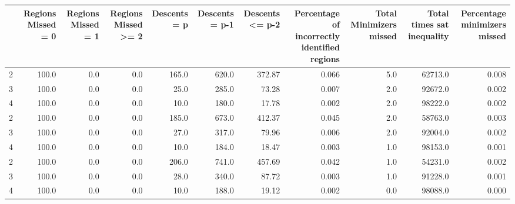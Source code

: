 \begin{tabular}{lrrrrrrrrrr}
\toprule
{} &  Regions Missed = 0 &  Regions Missed = 1 &  Regions Missed >= 2 &  Descents = p &  Descents = p-1 &  Descents <= p-2 &  Percentage of incorrectly identified regions &  Total Minimizers missed &  Total times sat inequality &  Percentage minimizers missed \\
\midrule
2 &               100.0 &                 0.0 &                  0.0 &         165.0 &           620.0 &           372.87 &                                         0.066 &                      5.0 &                     62713.0 &                         0.008 \\
3 &               100.0 &                 0.0 &                  0.0 &          25.0 &           285.0 &            73.28 &                                         0.007 &                      2.0 &                     92672.0 &                         0.002 \\
4 &               100.0 &                 0.0 &                  0.0 &          10.0 &           180.0 &            17.78 &                                         0.002 &                      2.0 &                     98222.0 &                         0.002 \\
2 &               100.0 &                 0.0 &                  0.0 &         185.0 &           673.0 &           412.37 &                                         0.045 &                      2.0 &                     58763.0 &                         0.003 \\
3 &               100.0 &                 0.0 &                  0.0 &          27.0 &           317.0 &            79.96 &                                         0.006 &                      2.0 &                     92004.0 &                         0.002 \\
4 &               100.0 &                 0.0 &                  0.0 &          10.0 &           184.0 &            18.47 &                                         0.003 &                      1.0 &                     98153.0 &                         0.001 \\
2 &               100.0 &                 0.0 &                  0.0 &         206.0 &           741.0 &           457.69 &                                         0.042 &                      1.0 &                     54231.0 &                         0.002 \\
3 &               100.0 &                 0.0 &                  0.0 &          28.0 &           340.0 &            87.72 &                                         0.003 &                      1.0 &                     91228.0 &                         0.001 \\
4 &               100.0 &                 0.0 &                  0.0 &          10.0 &           188.0 &            19.12 &                                         0.002 &                      0.0 &                     98088.0 &                         0.000 \\
\bottomrule
\end{tabular}
